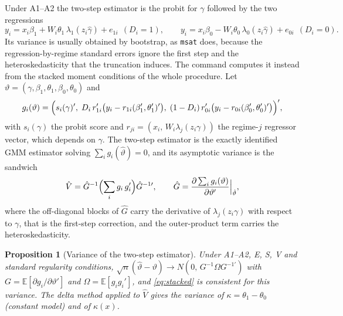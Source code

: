 \documentclass[11pt,a4paper]{article}
\theoremstyle{plain}
\newtheorem{proposition}{Proposition}
\theoremstyle{definition}
\theoremstyle{remark}
\newcommand{\E}{\mathbb{E}}
\newcommand{\1}{\mathbf{1}}
\newcommand{\cmd}[1]{\texttt{#1}}
\newcommand{\kX}{\kappa(x)}
\begin{document}
Under A1--A2 the two-step estimator is the probit for $\gamma$ followed
by the two regressions
\begin{equation}\label{eq:ts}
y_i=x_i\beta_1+W_i\theta_1\,\lambda_1(z_i\hat\gamma)+e_{1i}\ \ (D_i=1),\qquad
y_i=x_i\beta_0-W_i\theta_0\,\lambda_0(z_i\hat\gamma)+e_{0i}\ \ (D_i=0).
\end{equation}
Its variance is usually obtained by bootstrap, as \cmd{msat} does,
because the regression-by-regime standard errors ignore the first step
and the heteroskedasticity that the truncation induces. The command
computes it instead from the stacked moment conditions of the whole
procedure. Let $\vartheta=(\gamma,\beta_1,\theta_1,\beta_0,\theta_0)$ and
\begin{equation}\label{eq:moments}
g_i(\vartheta)=\Bigl(s_i(\gamma)',\;D_i\,r_{1i}'\bigl(y_i-r_{1i}(\beta_1',\theta_1')'\bigr),\;
(1-D_i)\,r_{0i}'\bigl(y_i-r_{0i}(\beta_0',\theta_0')'\bigr)\Bigr)',
\end{equation}
with $s_i(\gamma)$ the probit score and $r_{ji}=(x_i,\,W_i\lambda_j(z_i\gamma))$
the regime-$j$ regressor vector, which depends on $\gamma$. The
two-step estimator is the exactly identified GMM estimator solving
$\sum_ig_i(\hat\vartheta)=0$, and its asymptotic variance is the sandwich
\begin{equation}\label{eq:stacked}
\hat V=\hat G^{-1}\Bigl(\sum_ig_i\,g_i'\Bigr)\hat G^{-1\prime},\qquad
\hat G=\frac{\partial\sum_ig_i(\vartheta)}{\partial\vartheta'}\Big|_{\hat\vartheta},
\end{equation}
where the off-diagonal blocks of $\hat G$ carry the derivative of
$\lambda_j(z_i\gamma)$ with respect to $\gamma$, that is the first-step
correction, and the outer-product term carries the heteroskedasticity.

\begin{proposition}[Variance of the two-step estimator]\label{prop:stacked}
Under A1--A2, E, S, V and standard regularity conditions,
$\sqrt n(\hat\vartheta-\vartheta)\to N(0,\,G^{-1}\Omega G^{-1\prime})$
with $G=\E[\partial g_i/\partial\vartheta']$ and
$\Omega=\E[g_ig_i']$, and \eqref{eq:stacked} is consistent for this
variance. The delta method applied to $\hat V$ gives the variance of
$\kappa=\theta_1-\theta_0$ (constant model) and of $\kX$.
\end{proposition}
\end{document}
